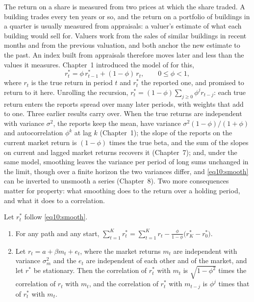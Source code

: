 \begin{chapterrefs}
The return on a share is measured from two prices at which the share traded. A building trades every
ten years or so, and the return on a portfolio of buildings in a quarter is usually measured from
appraisals: a valuer's estimate of what each building would sell for. Valuers work from the sales of
similar buildings in recent months and from the previous valuation, and both anchor the new estimate
to the past. An index built from appraisals therefore moves later and less than the values it
measures. Chapter~1 introduced the model of \textcite{geltner1993} for this,
\begin{equation}\label{eq10:smooth}
  r^*_t = \phi\,r^*_{t-1} + (1-\phi)\,r_t, \qquad 0\le\phi<1,
\end{equation}
where $r_t$ is the true return in period $t$ and $r^*_t$ the reported one, and promised to return to it
here. Unrolling the recursion, $r^*_t=(1-\phi)\sum_{j\ge0}\phi^jr_{t-j}$: each true return enters the
reports spread over many later periods, with weights that add to one. Three earlier results carry over.
When the true returns are independent with variance $\sigma^2$, the reports keep the mean, have
variance $\sigma^2(1-\phi)/(1+\phi)$ and autocorrelation $\phi^k$ at lag $k$ (Chapter~1); the slope
of the reports on the current market return is $(1-\phi)$ times the true beta, and the sum of the slopes
on current and lagged market returns recovers it (Chapter~7); and, under the same model, smoothing
leaves the variance per period of long sums unchanged in the limit, though over a finite horizon the two
variances differ, and \cref{eq10:smooth} can be inverted to unsmooth a series (Chapter~8). Two more
consequences matter for property: what smoothing does to the return over a holding period, and what it
does to a correlation.

\begin{proposition}\label{prop10:smooth}
Let $r^*_t$ follow \cref{eq10:smooth}.
\begin{enumerate}[label=(\alph*)]
  \item For any path and any start,
        $\sum_{t=1}^Kr^*_t=\sum_{t=1}^Kr_t-\frac{\phi}{1-\phi}\bigl(r^*_K-r^*_0\bigr)$.
  \item Let $r_t=a+\beta m_t+e_t$, where the market returns $m_t$ are independent with variance
        $\sigma_m^2$ and the $e_t$ are independent of each other and of the market, and let $r^*$ be
        stationary. Then the correlation of $r^*_t$ with $m_t$ is $\sqrt{1-\phi^2}$ times the
        correlation of $r_t$ with $m_t$, and the correlation of $r^*_t$ with $m_{t-j}$ is $\phi^j$
        times that of $r^*_t$ with $m_t$.
\end{enumerate}
\end{proposition}


\end{chapterrefs}
